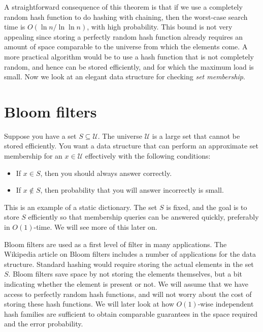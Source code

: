 A straightforward consequence of this theorem is that if we use a completely
random hash function to do hashing with chaining, then the worst-case search
time is $O(\ln n/\ln \ln n)$, with high probability. This bound is not very
appealing since storing a perfectly random hash function already requires an
amount of space comparable to the universe from which the elements come. A more
practical algorithm would be to use a hash function that is not completely
random, and hence can be stored efficiently, and for which the maximum load is
small. Now we look at an elegant data structure for checking \emph{set membership}.

\section{Bloom filters}

Suppose you have a set $S\subseteq \mathcal{U}$. The universe $\mathcal{U}$ is a
large set that cannot be stored efficiently. You want a data structure that can
perform an approximate set membership for an $x\in \mathcal{U}$ effectively with
the following conditions:
\begin{itemize}
\item If $x\in S$, then you should always answer correctly.
\item If $x\notin S$, then probability that you will answer incorrectly is small.
\end{itemize}

This is an example of a static dictionary. The set $S$ is fixed, and the goal is
to store $S$ efficiently so that membership queries can be answered quickly,
preferably in $O(1)$-time. We will see more of this later on.

  Bloom filters are used as a first level of filter in many
applications.  The Wikipedia article on Bloom filters includes a number of
applications for the data structure. Standard hashing would require storing the
actual elements in the set $S$. Bloom filters save space by not storing the
elements themselves, but a bit indicating whether the element is present or
not. We will assume that we have access to perfectly random hash functions, and
will not worry about the cost of storing these hash functions. We will later
look at how $O(1)$-wise independent hash families are sufficient to obtain
comparable guarantees in the space required and the error probability.


